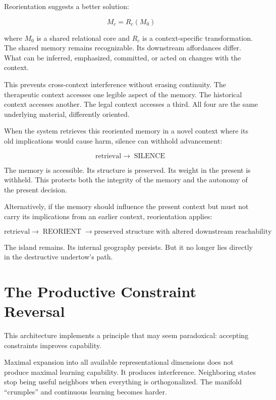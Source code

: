 \documentclass[12pt]{article}
\begin{document}
Reorientation suggests a better solution:

\begin{equation}
M_c = R_c(M_0)
\end{equation}

where $M_0$ is a shared relational core and $R_c$ is a context-specific transformation. The shared memory remains recognizable. Its downstream affordances differ. What can be inferred, emphasized, committed, or acted on changes with the context.

This prevents cross-context interference without erasing continuity. The therapeutic context accesses one legible aspect of the memory. The historical context accesses another. The legal context accesses a third. All four are the same underlying material, differently oriented.

When the system retrieves this reoriented memory in a novel context where its old implications would cause harm, silence can withhold advancement:

\begin{equation}
\text{retrieval} \rightarrow \operatorname{SILENCE}
\end{equation}

The memory is accessible. Its structure is preserved. Its weight in the present is withheld. This protects both the integrity of the memory and the autonomy of the present decision.

Alternatively, if the memory should influence the present context but must not carry its implications from an earlier context, reorientation applies:

\begin{equation}
\text{retrieval} \rightarrow \operatorname{REORIENT} \rightarrow \text{preserved structure with altered downstream reachability}
\end{equation}

The island remains. Its internal geography persists. But it no longer lies directly in the destructive undertow's path.

\section{The Productive Constraint Reversal}

This architecture implements a principle that may seem paradoxical: accepting constraints improves capability.

Maximal expansion into all available representational dimensions does not produce maximal learning capability. It produces interference. Neighboring states stop being useful neighbors when everything is orthogonalized. The manifold ``crumples'' and continuous learning becomes harder.
\end{document}
